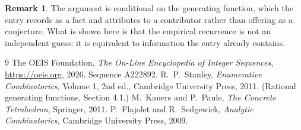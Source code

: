 \documentclass[11pt,a4paper]{article}
\theoremstyle{plain}
\theoremstyle{definition}
\newtheorem{remark}[theorem]{Remark}
\begin{document}
\begin{remark}
The argument is conditional on the generating function, which the entry records as a fact and
attributes to a contributor rather than offering as a conjecture. What is shown here is that
the empirical recurrence is not an independent guess: it is equivalent to information the
entry already contains.
\end{remark}

\begin{thebibliography}{9}
 The OEIS Foundation, \emph{The On-Line Encyclopedia of Integer
Sequences}, \url{https://oeis.org}, 2026. Sequence A222892.
 R.~P.~Stanley, \emph{Enumerative Combinatorics}, Volume 1, 2nd ed.,
Cambridge University Press, 2011. (Rational generating functions, Section 4.1.)
 M.~Kauers and P.~Paule, \emph{The Concrete Tetrahedron}, Springer, 2011.
 P.~Flajolet and R.~Sedgewick, \emph{Analytic Combinatorics}, Cambridge
University Press, 2009.
\end{thebibliography}
\end{document}
